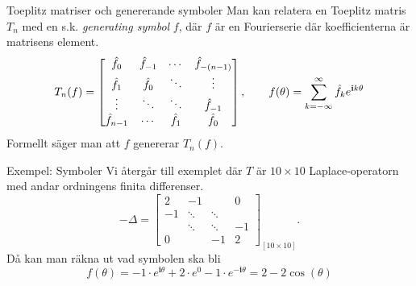 \documentclass{beamer}
\begin{document}
\begin{frame}{Toeplitz matriser och genererande symboler}
    Man kan relatera en Toeplitz matris $T_n$ med en s.k. \textit{generating symbol} $f$, där $f$ är en Fourierserie där koefficienterna är matrisens element.
\begin{equation}
    T_n(f) = \begin{bmatrix}
    \hat{\mathnormal{f}}_0&\hat{\mathnormal{f}}_{-1}& \cdots &\hat{\mathnormal{f}}_{-(n-1)} \\
     \hat{\mathnormal{f}}_{1}&  \hat{\mathnormal{f}}_0& \ddots &\vdots\\
    \vdots& \ddots& \ddots& \hat{\mathnormal{f}}_{-1} \\
     \hat{\mathnormal{f}}_{n-1}&\cdots& \hat{\mathnormal{f}}_{1}& \hat{\mathnormal{f}}_0
\end{bmatrix}, \quad\quad f(\theta) = \sum^\infty_{k = -\infty} \hat{\mathnormal{f}}_k e^{\mathbf{i}k\theta}
\end{equation}
Formellt säger man att $f$ genererar $T_n(f)$.
\end{frame}


\begin{frame}{Exempel: Symboler}
    Vi återgår till exemplet där $T$ är $10\times10$ Laplace-operatorn med andar ordningens finita differenser.
    \begin{equation}
        -\Delta = \begin{bmatrix}
        2 & -1 &  &  0\\
        -1 & \ddots & \ddots &  \\
         & \ddots & \ddots & -1 \\
         0& & -1 & 2
    \end{bmatrix}_{[10\times10]}.
    \end{equation}
    Då kan man räkna ut vad symbolen ska bli 
    \begin{equation}
        f(\theta) = -1 \cdot e^{\mathbf{i}\theta} + 2\cdot e^{0} -1 \cdot e^{-\mathbf{i}\theta} = 2 - 2\cos(\theta)
    \end{equation}
\end{frame}
\end{document}
